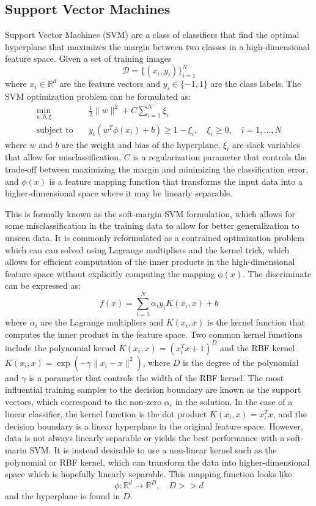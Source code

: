 \documentclass[12pt, letterpaper]{article}
\begin{document}
\subsection{Support Vector Machines}
Support Vector Machines (SVM) are a class of classifiers that find the optimal hyperplane
that maximizes the margin between two classes in a high-dimensional feature space. Given
a set of training images $$\mathcal{D} = \{(x_i, y_i)\}_{i=1}^N$$ where $x_i \in \mathbb{R}^d$
are the feature vectors and $y_i \in \{-1, 1\}$ are the class labels. The SVM optimization problem
can be formulated as:
\begin{align*}
	\min_{w, b, \xi} \quad  & \frac{1}{2} \|w\|^2 + C \sum_{i=1}^N \xi_i                             \\
	\text{subject to} \quad & y_i (w^T \phi(x_i) + b) \geq 1 - \xi_i, \quad \xi_i \geq 0, \quad i=1,
	\ldots, N
\end{align*}
where $w$ and $b$ are the weight and bias of the hyperplane, $\xi_i$ are slack variables that
allow for misclassification, $C$ is a regularization parameter that controls the trade-off
between maximizing the margin and minimizing the classification error, and $\phi(x)$ is a feature
mapping function that transforms the input data into a higher-dimensional space where it may be
linearly separable.

This is formally known as the soft-margin SVM formulation, which allows for some misclassification
in the training data to allow for better generalization to unseen data. It is commonly
reformulated as a contrained optimization problem which can can solved using Lagrange multipliers
and the kernel trick, which allows for efficient computation of the inner products in the
high-dimensional feature space without explicitly computing the mapping $\phi(x)$. The
discriminate can be expressed as:
\begin{equation*}
	f(x) = \sum_{i=1}^N \alpha_i y_i K(x_i, x) + b
\end{equation*}
where $\alpha_i$ are the Lagrange multipliers and $K(x_i, x)$ is the kernel function that
computes the inner product in the feature space. Two common kernel functions include the
polynomial kernel $K(x_i, x) = (x_i^T x + 1)^D$ and the RBF kernel
$K(x_i, x) = \exp(-\gamma \|x_i - x\|^2)$,
where $D$ is the degree of the polynomial and $\gamma$ is a parameter that controls the width
of the RBF kernel. The most influential training samples to the decision boundary are known as
the support vectors, which correspond to the non-zero $\alpha_i$ in the solution. In the case
of a linear classifier, the kernel function is the dot product $K(x_i, x) = x_i^T x$, and the
decision boundary is a linear hyperplane in the original feature space. However, data is not
always linearly separable or yields the best performance with a soft-marin SVM. It is instead
desirable to use a non-linear kernel such as the polynomial or RBF kernel, which can transform
the data into higher-dimensional space which is hopefully linearly separable. This
mapping function looks like:
\begin{equation*}
	\phi: \mathbb{R}^d \rightarrow \mathbb{R}^D, \quad D >> d
\end{equation*}
and the hyperplane is found in $D$.
\end{document}
